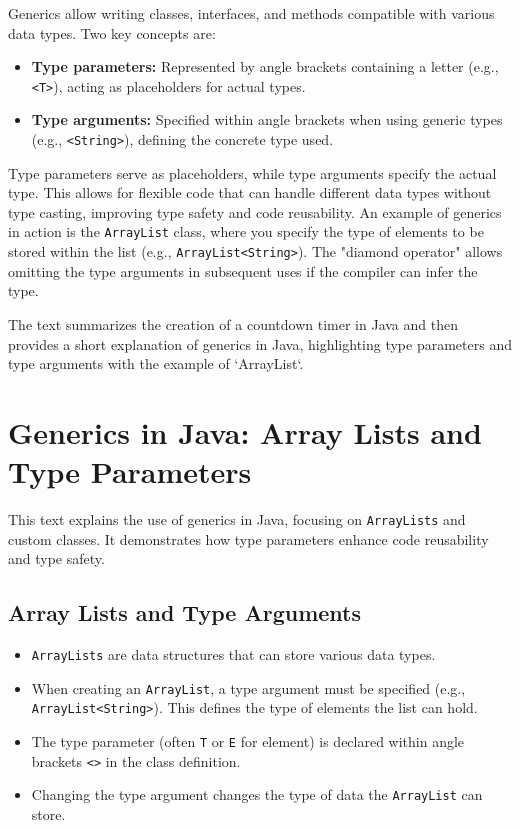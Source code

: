 \documentclass{article}
\begin{document}
\begin{itemize}
Generics allow writing classes, interfaces, and methods compatible with various data types.  Two key concepts are:

\begin{itemize}
    \item \textbf{Type parameters:}  Represented by angle brackets containing a letter (e.g., \texttt{<T>}), acting as placeholders for actual types.
    \item \textbf{Type arguments:}  Specified within angle brackets when using generic types (e.g., \texttt{<String>}), defining the concrete type used.
\end{itemize}

Type parameters serve as placeholders, while type arguments specify the actual type.  This allows for flexible code that can handle different data types without type casting, improving type safety and code reusability.  An example of generics in action is the \texttt{ArrayList} class, where you specify the type of elements to be stored within the list (e.g., \texttt{ArrayList<String>}). The "diamond operator" allows omitting the type arguments in subsequent uses if the compiler can infer the type.

The text summarizes the creation of a countdown timer in Java and then provides a short explanation of generics in Java, highlighting type parameters and type arguments with the example of `ArrayList`.


\section{Generics in Java: Array Lists and Type Parameters}

This text explains the use of generics in Java, focusing on \texttt{ArrayLists} and custom classes.  It demonstrates how type parameters enhance code reusability and type safety.

\subsection{Array Lists and Type Arguments}

\begin{itemize}
    \item \texttt{ArrayLists} are data structures that can store various data types.
    \item When creating an \texttt{ArrayList}, a type argument must be specified (e.g., \texttt{ArrayList<String>}).  This defines the type of elements the list can hold.
    \item The type parameter (often \texttt{T} or \texttt{E} for element) is declared within angle brackets \texttt{<>} in the class definition.
    \item Changing the type argument changes the type of data the \texttt{ArrayList} can store.
\end{itemize}


\end{itemize}
\end{document}
